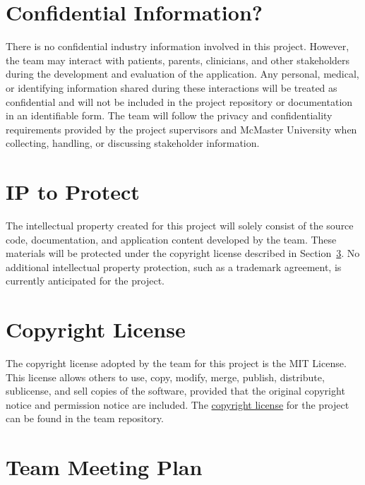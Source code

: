 \documentclass{article}
\begin{document}
\section{Confidential Information?}

There is no confidential industry information involved in this project.
However, the team may interact with patients, parents, clinicians, and other
stakeholders during the development and evaluation of the application.
Any personal, medical, or identifying information shared during these interactions
will be treated as confidential and will not be included in the project repository
or documentation in an identifiable form. The team will follow the privacy and
confidentiality requirements provided by the project supervisors and McMaster
University when collecting, handling, or discussing stakeholder information.

\section{IP to Protect}

The intellectual property created for this project will solely consist of the source code,
documentation, and application content developed by the team. These materials will be
protected under the copyright license described in Section~\ref{sec:copyright-license}.
No additional intellectual property protection, such as a trademark agreement, is
currently anticipated for the project.

\section{Copyright License}
\label{sec:copyright-license}

The copyright license adopted by the team for this project is the MIT License.
This license allows others to use, copy, modify, merge, publish, distribute, sublicense,
and sell copies of the software, provided that the original copyright notice and permission
notice are included. The \href{https://github.com/team-hindsight/ophthamology-game/blob/main/LICENSE}{copyright license}
for the project can be found in the team repository.

\section{Team Meeting Plan}
\end{document}
